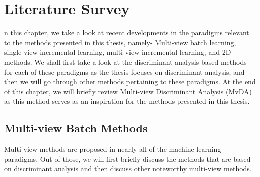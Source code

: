 \chapter{Literature Survey}
\label{ch:Lit}
n this chapter, we take a look at recent developments in the paradigms relevant to the methods presented in this thesis, namely- Multi-view batch learning, single-view incremental learning, multi-view incremental learning, and 2D methods. We shall first take a look at the discriminant analysis-based methods for each of these paradigms as the thesis focuses on discriminant analysis, and then we will go through other methods pertaining to these paradigms. At the end of this chapter, we will briefly review Multi-view Discriminant Analysis (MvDA) as this method serves as an inspiration for the methods presented in this thesis.




\section{Multi-view Batch Methods}
\label{sec:Lit_Mv}
Multi-view methods are proposed in nearly all of the machine learning paradigms. Out of those, we will first briefly discuss the methods that are based on discriminant analysis and then discuss other noteworthy multi-view methods.


